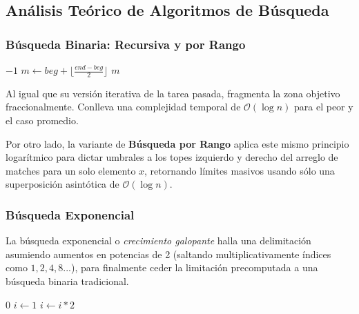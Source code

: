 \subsection{Análisis Teórico de Algoritmos de Búsqueda}\label{sec:busqueda_dv}

\subsubsection{Búsqueda Binaria: Recursiva y por Rango}\label{sec:busqueda_binaria_rango}

\begin{algorithm}[H]
    \caption{Búsqueda Binaria Recursiva $\triangleright$ $V[beg..end]$ ordenado}
    \begin{algorithmic}[1]
            \Return $-1$
        \EndIf
        \State $m \gets beg + \lfloor\frac{end - beg}{2}\rfloor$
            \Return $m$
            \Return {}
        \Else
            \Return {}
        \EndIf
        \EndProcedure
    \end{algorithmic}
\end{algorithm}

Al igual que su versión iterativa de la tarea pasada, fragmenta la zona objetivo fraccionalmente. Conlleva una complejidad temporal de $\mathcal{O}(\log n)$ para el peor y el caso promedio.

Por otro lado, la variante de \textbf{Búsqueda por Rango} aplica este mismo principio logarítmico para dictar umbrales a los topes izquierdo y derecho del arreglo de matches para un solo elemento $x$, retornando límites masivos usando sólo una superposición asintótica de $\mathcal{O}(\log n)$.

\subsubsection{Búsqueda Exponencial}\label{sec:busqueda_exponencial}
La búsqueda exponencial o \textit{crecimiento galopante} halla una delimitación asumiendo aumentos en potencias de 2 (saltando multiplicativamente índices como $1, 2, 4, 8...$), para finalmente ceder la limitación precomputada a una búsqueda binaria tradicional.

\begin{algorithm}[H]
    \caption{Búsqueda Exponencial}
    \begin{algorithmic}[1]
         \Return $0$ \EndIf
        \State $i \gets 1$
            \State $i \gets i * 2$
        \EndWhile
        \Return {}
        \EndProcedure
    \end{algorithmic}
\end{algorithm}

